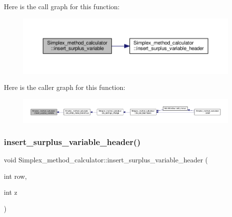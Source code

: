 Here is the call graph for this function\+:\nopagebreak
\begin{figure}[H]
\begin{center}
\leavevmode
\includegraphics[width=350pt]{classSimplex__method__calculator_a4e034d789bea086efc896fee4d15682b_cgraph}
\end{center}
\end{figure}
Here is the caller graph for this function\+:\nopagebreak
\begin{figure}[H]
\begin{center}
\leavevmode
\includegraphics[width=350pt]{classSimplex__method__calculator_a4e034d789bea086efc896fee4d15682b_icgraph}
\end{center}
\end{figure}
\mbox{\label{classSimplex__method__calculator_a4e959dd505b0924ac592326c21c7d0cf}} 
\subsubsection{\texorpdfstring{insert\+\_\+surplus\+\_\+variable\+\_\+header()}{insert\_surplus\_variable\_header()}}
{\footnotesize\ttfamily void Simplex\+\_\+method\+\_\+calculator\+::insert\+\_\+surplus\+\_\+variable\+\_\+header (\begin{DoxyParamCaption}\item[{int}]{row,  }\item[{int}]{z }\end{DoxyParamCaption})\hspace{0.3cm}{\ttfamily [private]}}



